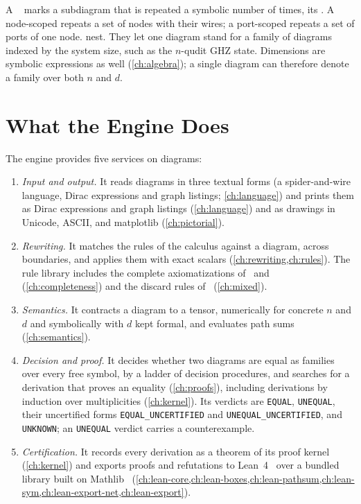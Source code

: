 A \term{\bbox}~\cite{dixon2009graphical,kissinger2014pattern} marks a subdiagram that is repeated a symbolic number of times, its . A node-scoped \bbox{} repeats a set of nodes with their wires; a port-scoped \bbox{} repeats a set of ports of one node. \bboxes{} nest. They let one diagram stand for a family of diagrams indexed by the system size, such as the $n$-qudit GHZ state. Dimensions are symbolic expressions as well (\cref{ch:algebra}); a single diagram can therefore denote a family over both $n$ and $d$.

\section{What the Engine Does}\label{sec:overview-capabilities}

The engine provides five services on diagrams:
\begin{enumerate}
\item \emph{Input and output.} It reads diagrams in three textual forms (a spider-and-wire language, Dirac expressions and graph listings; \cref{ch:language}) and prints them as Dirac expressions and graph listings (\cref{ch:language}) and as drawings in Unicode, ASCII, and matplotlib (\cref{ch:pictorial}).
\item \emph{Rewriting.} It matches the rules of the calculus against a diagram, across \bbox{} boundaries, and applies them with exact scalars (\cref{ch:rewriting,ch:rules}). The rule library includes the complete axiomatizations of~\cite{poor2023zxw} and~\cite{wang2023qufinitezxw} (\cref{ch:completeness}) and the discard rules of~\cite{carette2019mixed} (\cref{ch:mixed}).
\item \emph{Semantics.} It contracts a diagram to a tensor, numerically for concrete $n$ and $d$ and symbolically with $d$ kept formal, and evaluates path sums~\cite{amy2018pathsums} (\cref{ch:semantics}).
\item \emph{Decision and proof.} It decides whether two diagrams are equal as families over every free symbol, by a ladder of decision procedures, and searches for a derivation that proves an equality (\cref{ch:proofs}), including derivations by induction over multiplicities (\cref{ch:kernel}). Its verdicts are \texttt{EQUAL}, \texttt{UNEQUAL}, their uncertified forms \texttt{EQUAL\_UNCERTIFIED} and \texttt{UNEQUAL\_UNCERTIFIED}, and \texttt{UNKNOWN}; an \texttt{UNEQUAL} verdict carries a counterexample.
\item \emph{Certification.} It records every derivation as a theorem of its proof kernel (\cref{ch:kernel}) and exports proofs and refutations to Lean~4~\cite{demoura2021lean4} over a bundled library built on Mathlib~\cite{mathlib2020} (\cref{ch:lean-core,ch:lean-boxes,ch:lean-pathsum,ch:lean-sym,ch:lean-export-net,ch:lean-export}).
\end{enumerate}

